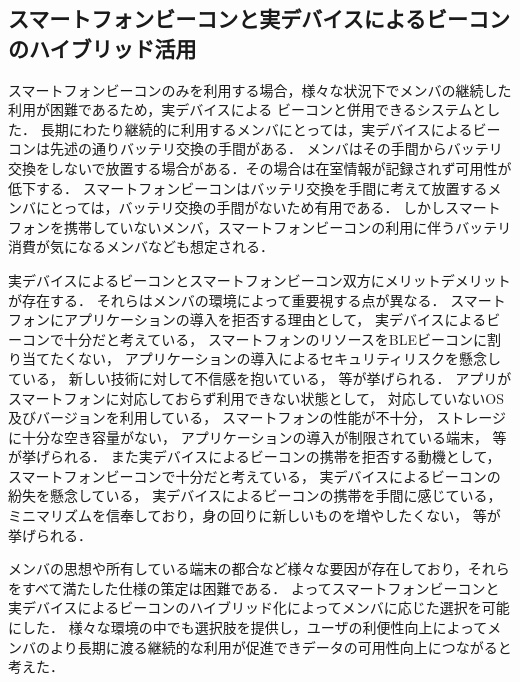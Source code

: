 \subsection{スマートフォンビーコンと実デバイスによるビーコンのハイブリッド活用}
スマートフォンビーコンのみを利用する場合，様々な状況下でメンバの継続した利用が困難であるため，実デバイスによる
ビーコンと併用できるシステムとした．
長期にわたり継続的に利用するメンバにとっては，実デバイスによるビーコンは先述の通りバッテリ交換の手間がある．
メンバはその手間からバッテリ交換をしないで放置する場合がある．その場合は在室情報が記録されず可用性が低下する．
スマートフォンビーコンはバッテリ交換を手間に考えて放置するメンバにとっては，バッテリ交換の手間がないため有用である．
しかしスマートフォンを携帯していないメンバ，スマートフォンビーコンの利用に伴うバッテリ消費が気になるメンバなども想定される．

実デバイスによるビーコンとスマートフォンビーコン双方にメリットデメリットが存在する．
それらはメンバの環境によって重要視する点が異なる．
スマートフォンにアプリケーションの導入を拒否する理由として，%
実デバイスによるビーコンで十分だと考えている，
スマートフォンのリソースをBLEビーコンに割り当てたくない，
アプリケーションの導入によるセキュリティリスクを懸念している，
新しい技術に対して不信感を抱いている，
等が挙げられる．
アプリがスマートフォンに対応しておらず利用できない状態として，
対応していないOS及びバージョンを利用している，
スマートフォンの性能が不十分，
ストレージに十分な空き容量がない，
アプリケーションの導入が制限されている端末，
等が挙げられる．
また実デバイスによるビーコンの携帯を拒否する動機として，
スマートフォンビーコンで十分だと考えている，
実デバイスによるビーコンの紛失を懸念している，
実デバイスによるビーコンの携帯を手間に感じている，
ミニマリズムを信奉しており，身の回りに新しいものを増やしたくない，
等が挙げられる．


メンバの思想や所有している端末の都合など様々な要因が存在しており，それらをすべて満たした仕様の策定は困難である．
よってスマートフォンビーコンと実デバイスによるビーコンのハイブリッド化によってメンバに応じた選択を可能にした．
様々な環境の中でも選択肢を提供し，ユーザの利便性向上によってメンバのより長期に渡る継続的な利用が促進できデータの可用性向上につながると考えた．

